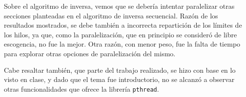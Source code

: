 \documentclass{article}\usepackage[]{graphicx}\usepackage[]{color}
\begin{document}
Sobre el algoritmo de inversa, vemos que se debería intentar paralelizar otras secciones planteadas en el algoritmo de inversa secuencial. Razón de los resultados mostrados, se debe también a incorrecta repartición de los límites de los hilos, ya que, como la paralelización, que en principio se consideró de libre escogencia, no fue la mejor. Otra razón, con menor peso, fue la falta de tiempo para explorar otras opciones de paralelización del mismo.

Cabe resaltar también, que parte del trabajo realizado, se hizo con base en lo visto en clase, y dado que el tema fue introductorio, no se alcanzó a observar otras funcionalidades que ofrece la librería \texttt{pthread}.
\end{document}
